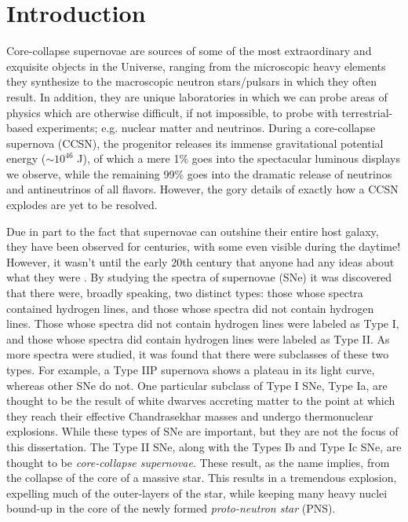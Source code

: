 \chapter{Introduction}

Core-collapse supernovae are sources of some of the most extraordinary and
exquisite objects in the Universe, ranging from the microscopic heavy elements
they synthesize to the macroscopic neutron stars/pulsars in
which they often result.
In addition, they are unique laboratories in which we can probe areas of
physics which are otherwise difficult, if not impossible, to probe with
terrestrial-based experiments; e.g. nuclear matter and neutrinos.
During a core-collapse supernova (CCSN), the progenitor releases its immense
gravitational potential energy ($\sim10^{46}$ J), of which a mere 1\% goes into
the spectacular luminous displays we observe, while the remaining 99\% goes
into the dramatic release of neutrinos and antineutrinos of all flavors.
However, the gory details of exactly how a CCSN explodes are yet to be resolved.

Due in part to the fact that supernovae can outshine their entire host galaxy,
they have been observed for centuries, with some even visible during the
daytime!
However, it wasn't until the early 20th century that anyone had any ideas about
what they were \citep{bw2017}.
By studying the spectra of supernovae (SNe) it was discovered that there were,
broadly speaking, two distinct types: those whose spectra contained hydrogen
lines, and those whose spectra did not contain hydrogen lines.
Those whose spectra did not contain hydrogen lines were labeled as Type I,
and those whose spectra did contain hydrogen lines were labeled as Type II.
As more spectra were studied, it was found that there were subclasses of these
two types.
For example, a Type IIP supernova shows a plateau in its light curve,
whereas other SNe do not.
One particular subclass of Type I SNe, Type Ia, are thought to be the result of
white dwarves accreting matter to the point at which they reach their effective
Chandrasekhar masses and undergo thermonuclear explosions.
While these types of SNe are important,
but they are not the focus of this dissertation.
The Type II SNe, along with the Types Ib and Type Ic SNe, are thought to be
{\it core-collapse supernovae}.
These result, as the name implies, from the collapse of the core of a
massive star.
This results in a tremendous explosion, expelling much of the outer-layers of
the star, while keeping many heavy nuclei bound-up in the core
of the newly formed {\it proto-neutron star} (PNS).

